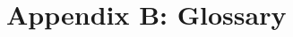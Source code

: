 \documentclass[../mthe-493-project-proposal.tex]{subfiles}
\begin{document}
    \chapter{Appendix B: Glossary}
    \label{ap:glossary}
    
    
    
\end{document}
